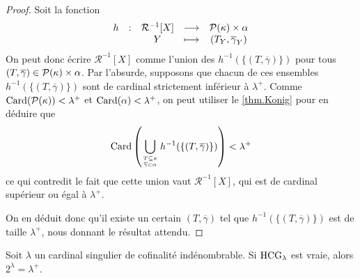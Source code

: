 \begin{proof}
  Soit la fonction
  \[\begin{array}{ccccc}
  h & : & \mathcal R^{-1}[X] & \longrightarrow & \mathcal{P}(\kappa)\times\alpha\\
  & & Y & \longmapsto & (T_Y,\overline\gamma_Y)
  \end{array}\]
  On peut donc écrire $\mathcal R^{-1}[X]$ comme l'union des
  $h^{-1}(\{(T,\overline\gamma)\})$ pour tous
  $(T,\overline\gamma)\in\mathcal{P}(\kappa)\times\alpha$. Par l'absurde,
  supposons que chacun de ces ensembles $h^{-1}(\{(T,\overline\gamma)\})$ sont
  de cardinal strictement inférieur à $\lambda^+$. Comme
  $\operatorname{Card}(\mathcal{P}(\kappa)) < \lambda^+$ et $\operatorname{Card}(\alpha) < \lambda^+$, on
  peut utiliser le \cref{thm.Konig} pour en déduire que
  \[\Card\left(
  \bigcup_{\genfrac{}{}{0pt}{2}{T\subseteq \kappa}{\overline\gamma\in \alpha}}
  h^{-1}(\{(T,\overline\gamma)\})\right) < \lambda^+\]
  ce qui contredit le fait que cette union vaut $\mathcal R^{-1}[X]$, qui est
  de cardinal supérieur ou égal à $\lambda^+$.

  On en déduit donc qu'il existe un certain $(T,\overline\gamma)$ tel que
  $h^{-1}(\{(T,\overline\gamma)\})$ est de taille $\lambda^+$, nous donnant le
  résultat attendu.
\end{proof}

\begin{theorem}[Silver]
  Soit $\lambda$ un cardinal singulier de cofinalité indénombrable. Si
  $\operatorname{HCG}_\lambda$ est vraie, alors $2^\lambda = \lambda^+$.
\end{theorem}

